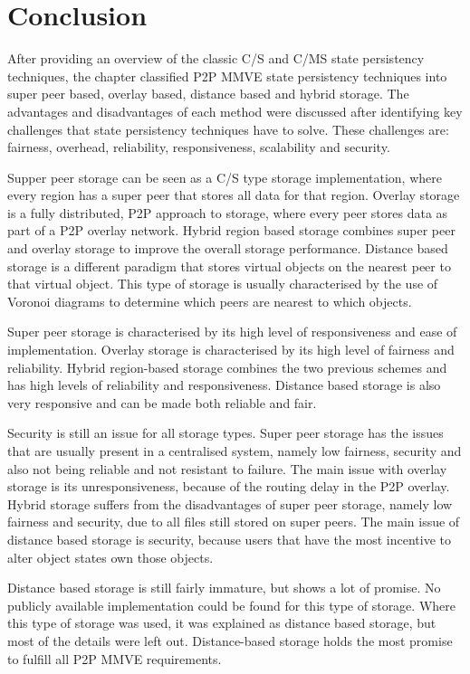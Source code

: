 \section{Conclusion}

After providing an overview of the classic C/S and C/MS state persistency techniques, the chapter classified P2P MMVE state persistency techniques into super peer based, overlay based, distance based and hybrid storage. The advantages and disadvantages of each method were discussed after identifying key challenges that state persistency techniques have to solve. These challenges are: fairness, overhead, reliability, responsiveness, scalability and security.

Supper peer storage can be seen as a C/S type storage implementation, where every region has a super peer that stores all data for that region. Overlay storage is a fully distributed, P2P approach to storage, where every peer stores data as part of a P2P overlay network. Hybrid region based storage combines super peer and overlay storage to improve the overall storage performance. Distance based storage is a different paradigm that stores virtual objects on the nearest peer to that virtual object. This type of storage is usually characterised by the use of Voronoi diagrams to
determine which peers are nearest to which objects.

Super peer storage is characterised by its high level of responsiveness and ease of implementation. Overlay storage is characterised by its high level of fairness and reliability. Hybrid region-based storage combines the two previous schemes and has high levels of reliability and responsiveness. Distance based storage is also very responsive and can be made both reliable and fair.

Security is still an issue for all storage types. Super peer storage has the issues that are usually present in a centralised system, namely low fairness, security and also not being reliable and not resistant to failure. The main issue with overlay storage is its unresponsiveness, because of the routing delay in the P2P overlay. Hybrid storage suffers from the disadvantages of super peer storage, namely low fairness and security, due to all files still stored on super peers. The main issue of distance based storage is security, because users that have the most incentive to alter object states own those objects.

Distance based storage is still fairly immature, but shows a lot of promise. No publicly available implementation could be found for this type of storage. Where this type of storage was used, it was explained as distance based storage, but most of the details were left out. Distance-based storage holds the most promise to fulfill all P2P MMVE requirements.

